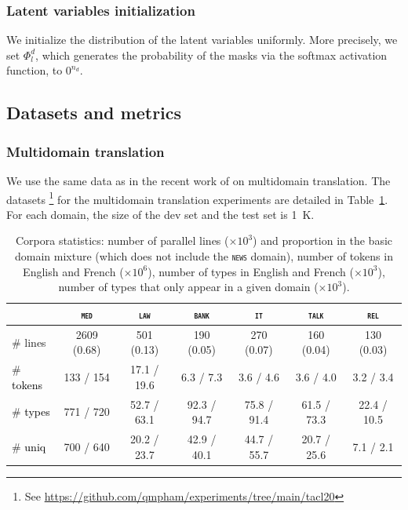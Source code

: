 \documentclass[11pt]{article}
\newcommand{\fyDone}[1]{\done[FY]\Todo[FY:]{\textcolor{orange}{#1}}}
\newcommand{\revisiondone}[1]{\textcolor{black}{#1}}
\newcommand{\domain}[1]{\texttt{\textsc{#1}}}
\begin{document}
\subsubsection{Latent variables initialization}
We initialize the distribution of the latent variables uniformly. More precisely, we set $\Phi_l^d$, which generates the probability of the masks via the softmax activation function, to $0^{n_d}$.
\subsection{Datasets and metrics}
\subsubsection{Multidomain translation}
We use the same data as in the recent work of \citet{Pham21revisiting} on multidomain translation.\fyDone{Add public to the data link} The datasets \footnote{See \url{https://github.com/qmpham/experiments/tree/main/tacl20}} for the multidomain translation experiments are detailed in Table~\ref{tab:Corpora-chap4}. For each domain, the size of the dev set and the test set is 1~K. 
\begin{table}[h!]
  \centering
  \begin{tabular}{|l|cccccc|} %
    \cline{2-7} 
    \multicolumn{1}{c|}{} & \multicolumn{1}{c}{\domain{med}} & \multicolumn{1}{c}{\domain{law}} & \multicolumn{1}{c}{\domain{bank}} & \multicolumn{1}{c}{\domain{it}} & \multicolumn{1}{c}{\domain{talk}} & \multicolumn{1}{c}{\domain{rel}} \\
    \hline 
    \# lines & 2609 (0.68) & 501 (0.13) & 190 (0.05) & 270 (0.07) & 160 (0.04) & 130 (0.03) \\
    \# \revisiondone{tokens}  &  133 / 154  &  17.1 / 19.6 &  6.3 / 7.3 &  3.6 / 4.6 &  3.6 / 4.0 &  3.2 / 3.4 \\
    \# \revisiondone{types}  & 771 / 720 & 52.7 / 63.1 & 92.3 / 94.7 & 75.8 / 91.4 & 61.5 / 73.3 & 22.4 / 10.5 \\
    \# \revisiondone{uniq} & 700 / 640 & 20.2 / 23.7 & 42.9 / 40.1 & 44.7 / 55.7 & 20.7 / 25.6 & 7.1 / 2.1 \\
    \hline
  \end{tabular}
  \caption{Corpora statistics: number of parallel lines ($\times 10^3$) and proportion in the basic domain mixture (which does not include the \domain{news} domain), number of tokens in English and French ($\times 10^6$), number of types in English and French ($\times 10^3$), number of types that only appear in a given domain ($\times 10^3$).}
\label{tab:Corpora-chap4}
\end{table}
\end{document}

